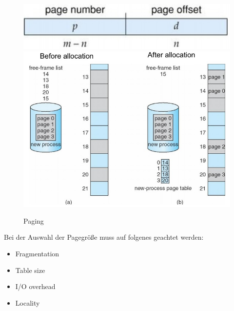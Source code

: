 \documentclass[a4paper]{scrreprt}
\begin{document}
\begin{figure}[ht]
\centering
\includegraphics[scale=0.40]{graphics/numberoffset.png}
\includegraphics[scale=0.50]{graphics/paging1.png}
\caption{Paging}
\end{figure}


Bei der Auswahl der Pagegröße muss auf folgenes geachtet werden:
\begin{itemize}
\item Fragmentation
\item Table size
\item I/O overhead
\item Locality
\end{itemize}
\end{document}
